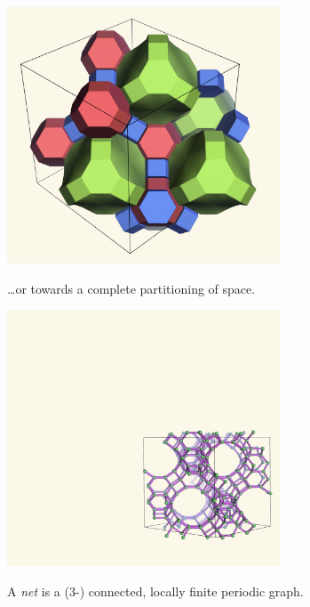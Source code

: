 \documentclass{beamer}
\begin{document}
\begin{frame}
  \begin{center}
    \includegraphics[height=3in]{fau-tiling-new}

    \dots or towards a complete partitioning of space.
  \end{center}
\end{frame}

\begin{frame}
  \begin{center}
    \includegraphics[height=3in]{fau-111}

    A {\em net} is a (3-) connected, locally finite periodic graph.
  \end{center}
\end{frame}
\end{document}
